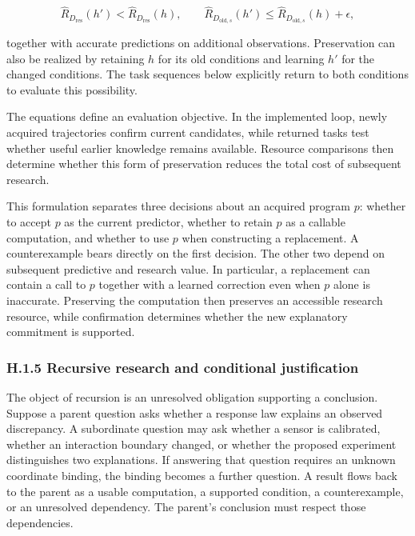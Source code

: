 \documentclass[11pt,a4paper]{article}
\begin{document}
\[
\widehat R_{D_{\mathrm{res}}}(h')
<\widehat R_{D_{\mathrm{res}}}(h),
\qquad
\widehat R_{D_{\mathrm{old},s}}(h')
\leq\widehat R_{D_{\mathrm{old},s}}(h)+\epsilon,
\]


together with accurate predictions on additional observations. Preservation can also be realized by retaining \(h\) for its old conditions and learning \(h'\) for the changed conditions. The task sequences below explicitly return to both conditions to evaluate this possibility.


The equations define an evaluation objective. In the implemented loop, newly acquired trajectories confirm current candidates, while returned tasks test whether useful earlier knowledge remains available. Resource comparisons then determine whether this form of preservation reduces the total cost of subsequent research.


This formulation separates three decisions about an acquired program \(p\): whether to accept \(p\) as the current predictor, whether to retain \(p\) as a callable computation, and whether to use \(p\) when constructing a replacement. A counterexample bears directly on the first decision. The other two depend on subsequent predictive and research value. In particular, a replacement can contain a call to \(p\) together with a learned correction even when \(p\) alone is inaccurate. Preserving the computation then preserves an accessible research resource, while confirmation determines whether the new explanatory commitment is supported.


\subsubsection*{H.1.5 Recursive research and conditional justification}

The object of recursion is an unresolved obligation supporting a conclusion. Suppose a parent question asks whether a response law explains an observed discrepancy. A subordinate question may ask whether a sensor is calibrated, whether an interaction boundary changed, or whether the proposed experiment distinguishes two explanations. If answering that question requires an unknown coordinate binding, the binding becomes a further question. A result flows back to the parent as a usable computation, a supported condition, a counterexample, or an unresolved dependency. The parent's conclusion must respect those dependencies.
\end{document}
